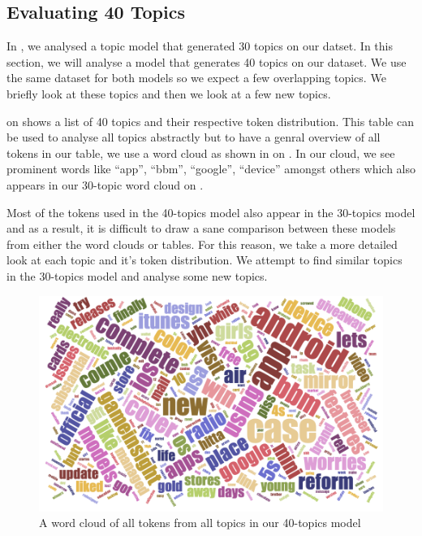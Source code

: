 \subsection{Evaluating 40 Topics}
\label{sec:evaluating-40-topics}
In , we analysed a topic model that generated 30 topics on our
datset. In this section, we will analyse a model that generates 40 topics on our dataset. We use the
same dataset for both models so we expect a few overlapping topics. We briefly look at these topics
and then we look at a few new topics.

 on  shows a list of 40 topics and their respective
token distribution. This table can be used to analyse all topics abstractly but to have a genral
overview of all tokens in our table, we use a word cloud as shown in  on
. In our cloud, we see prominent words like ``app'', ``bbm'',
``google'', ``device'' amongst others which also appears in our 30-topic word cloud on
.

Most of the tokens used in the 40-topics model also appear in the 30-topics model and as a result, it is
difficult to draw a sane comparison between these models from either the word clouds or tables. For
this reason, we take a more detailed look at each topic and it's token distribution. We attempt to
find similar topics in the 30-topics model and analyse some new topics.\\

\begin{figure}
\begin{center}
  \includegraphics[scale=0.75,angle=90]{Figures/40_topics_cloud}
\end{center}
\caption{A word cloud of all tokens from all topics in our 40-topics model}
\label{fig:40-topics-cloud}
\end{figure}

